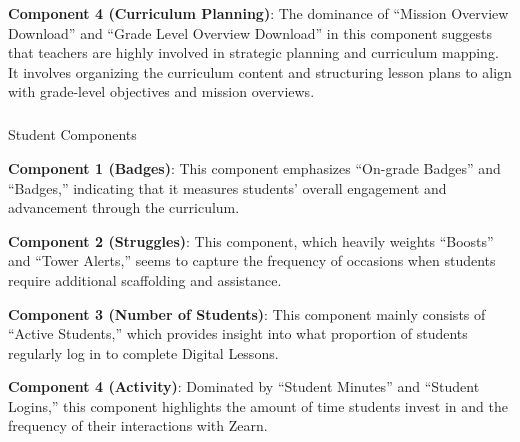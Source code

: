 \documentclass[
  number,
  preprint,
  3p,
  onecolumn]{elsarticle}
\makeatletter
\let\oldsubparagraph\subparagraph
\renewcommand{\subparagraph}{
    \@ifstar
      \xxxSubParagraphStar
      \xxxSubParagraphNoStar
  }
\newcommand{\xxxSubParagraphStar}[1]{\oldsubparagraph*{#1}\mbox{}}
\newcommand{\xxxSubParagraphNoStar}[1]{\oldsubparagraph{#1}\mbox{}}
\makeatother
\begin{document}
\textbf{Component 4 (Curriculum Planning)}: The dominance of ``Mission
Overview Download'' and ``Grade Level Overview Download'' in this
component suggests that teachers are highly involved in strategic
planning and curriculum mapping. It involves organizing the curriculum
content and structuring lesson plans to align with grade-level
objectives and mission overviews.

\subparagraph{Student Components}\label{student-components}

\textbf{Component 1 (Badges)}: This component emphasizes ``On-grade
Badges'' and ``Badges,'' indicating that it measures students' overall
engagement and advancement through the curriculum.

\textbf{Component 2 (Struggles)}: This component, which heavily weights
``Boosts'' and ``Tower Alerts,'' seems to capture the frequency of
occasions when students require additional scaffolding and assistance.

\textbf{Component 3 (Number of Students)}: This component mainly
consists of ``Active Students,'' which provides insight into what
proportion of students regularly log in to complete Digital Lessons.

\textbf{Component 4 (Activity)}: Dominated by ``Student Minutes'' and
``Student Logins,'' this component highlights the amount of time
students invest in and the frequency of their interactions with Zearn.
\end{document}
